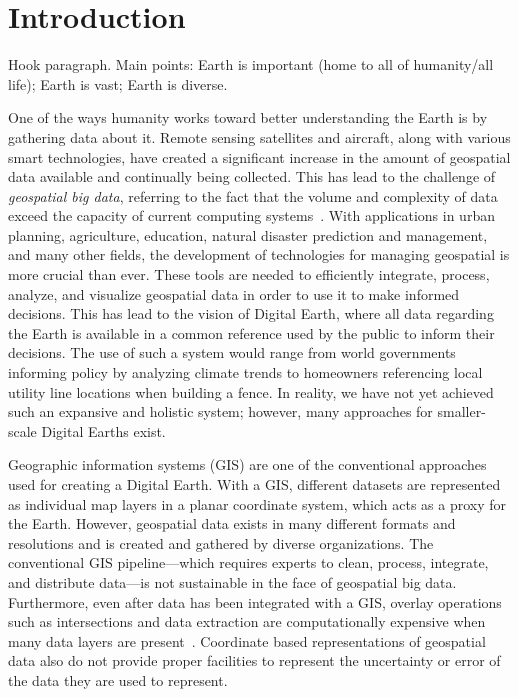 \chapter{Introduction}
Hook paragraph. Main points:
Earth is important (home to all of humanity/all life);
Earth is vast;
Earth is diverse.



One of the ways humanity works toward better understanding the Earth is by gathering data about it.
Remote sensing satellites and aircraft, along with various smart technologies, have created a significant increase in the amount of geospatial data available and continually being collected.
This has lead to the challenge of \textit{geospatial big data}, referring to the fact that the volume and complexity of data exceed the capacity of current computing systems~\cite{lee2015geospatial}.
With applications in urban planning, agriculture, education, natural disaster prediction and management, and many other fields, the development of technologies for managing geospatial is more crucial than ever.
These tools are needed to efficiently integrate, process, analyze, and visualize geospatial data in order to use it to make informed decisions.
This has lead to the vision of Digital Earth, where all data regarding the Earth is available in a common reference used by the public to inform their decisions.
The use of such a system would range from world governments informing policy by analyzing climate trends to homeowners referencing local utility line locations when building a fence.
In reality, we have not yet achieved such an expansive and holistic system; however, many approaches for smaller-scale Digital Earths exist.


Geographic information systems (GIS) are one of the conventional approaches used for creating a Digital Earth.
With a GIS, different datasets are represented as individual map layers in a planar coordinate system, which acts as a proxy for the Earth.
However, geospatial data exists in many different formats and resolutions and is created and gathered by diverse organizations.
The conventional GIS pipeline---which requires experts to clean, process, integrate, and distribute data---is not sustainable in the face of geospatial big data.
Furthermore, even after data has been integrated with a GIS, overlay operations such as intersections and data extraction are computationally expensive when many data layers are present~\cite{wang2015improving}.
Coordinate based representations of geospatial data also do not provide proper facilities to represent the uncertainty or error of the data they are used to represent.


